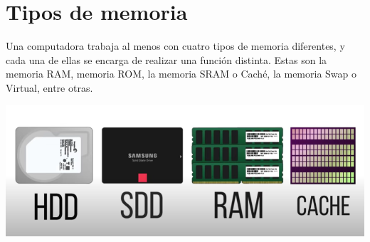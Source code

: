 \documentclass[12pt]{report}
\begin{document}
\section{Tipos de memoria}
Una computadora trabaja al menos con cuatro tipos de memoria diferentes, y cada una de ellas se encarga de realizar una función distinta. Estas son la memoria RAM, memoria ROM, la memoria SRAM o Caché, la memoria Swap o Virtual, entre otras.

 \includegraphics[width=1.00\textwidth]{MEMORIAS.PNG}
 
\end{document}

